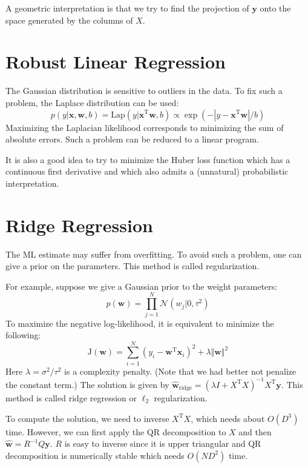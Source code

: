 \documentclass[openany]{book}
\begin{document}
A geometric interpretation is that we try to find the projection of $\mathbf{y}$ onto the space generated by the columns of $X$.

\section{Robust Linear Regression}
The Gaussian distribution is sensitive to outliers in the data. To fix such a problem, the Laplace distribution can be used:
\begin{equation}
p(y|\mathbf{x},\mathbf{w},b)=\mathrm{Lap}(y|\mathbf{x}^{\mathrm{T}}\mathbf{w},b)\propto\exp(-|y-\mathbf{x}^{\mathrm{T}}\mathbf{w}|/b)
\end{equation}
Maximizing the Laplacian likelihood corresponds to minimizing the sum of absolute errors. Such a problem can be reduced to a linear program.

It is also a good idea to try to minimize the Huber loss function which has a continuous first derivative and which also admits a (unnatural) probabilistic interpretation.

\section{Ridge Regression}
The ML estimate may suffer from overfitting. To avoid such a problem, one can give a prior on the parameters. This method is called regularization.

For example, suppose we give a Gaussian prior to the weight parameters:
\begin{equation}
p(\mathbf{w})=\prod_{j=1}^N\mathcal{N}(w_j|0,\tau^2)
\end{equation}
To maximize the negative log-likelihood, it is equivalent to minimize the following:
\begin{equation}
\mathrm{J}(\mathbf{w})=\sum_{i=1}^N(y_i-\mathbf{w}^{\mathrm{T}}\mathbf{x}_i)^2+\lambda\Vert\mathbf{w}\Vert^2
\end{equation}
Here $\lambda=\sigma^2/\tau^2$ is a complexity penalty. (Note that we had better not penalize the constant term.) The solution is given by $\hat{\mathbf{w}}_{\mathrm{ridge}}=(\lambda I+X^{\mathrm{T}}X)^{-1}X^{\mathrm{T}}\mathbf{y}$. This method is called ridge regression or $\ell_2$ regularization.

To compute the solution, we need to inverse $X^{\mathrm{T}}X$, which needs about $O(D^3)$ time. However, we can first apply the QR decomposition to $X$ and then $\hat{\mathbf{w}}=R^{-1}Q\mathbf{y}$. $R$ is easy to inverse since it is upper triangular and QR decomposition is numerically stable which needs $O(ND^2)$ time.
\end{document}
